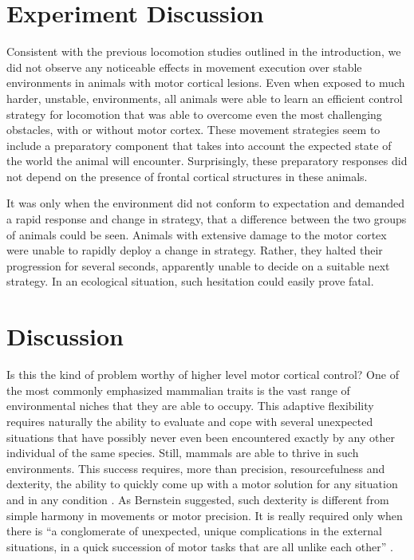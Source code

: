 \section{Experiment Discussion}

Consistent with the previous locomotion studies outlined in the introduction, we did not observe any noticeable effects in movement execution over stable environments in animals with motor cortical lesions. Even when exposed to much harder, unstable, environments, all animals were able to learn an efficient control strategy for locomotion that was able to overcome even the most challenging obstacles, with or without motor cortex. These movement strategies seem to include a preparatory component that takes into account the expected state of the world the animal will encounter. Surprisingly, these preparatory responses did not depend on the presence of frontal cortical structures in these animals.

It was only when the environment did not conform to expectation and demanded a rapid response and change in strategy, that a difference between the two groups of animals could be seen. Animals with extensive damage to the motor cortex were unable to rapidly deploy a change in strategy. Rather, they halted their progression for several seconds, apparently unable to decide on a suitable next strategy. In an ecological situation, such hesitation could easily prove fatal.

\section{Discussion}

Is this the kind of problem worthy of higher level motor cortical control? One of the most commonly emphasized mammalian traits is the vast range of environmental niches that they are able to occupy. This adaptive flexibility requires naturally the ability to evaluate and cope with several unexpected situations that have possibly never even been encountered exactly by any other individual of the same species. Still, mammals are able to thrive in such environments. This success requires, more than precision, resourcefulness and dexterity, the ability to quickly come up with a motor solution for any situation and in any condition \cite{Bernstein1996}. As Bernstein suggested, such dexterity is different from simple harmony in movements or motor precision. It is really required only when there is \enquote{a conglomerate of unexpected, unique complications in the external situations, in a quick succession of motor tasks that are all unlike each other} \cite{Bernstein1996}.

